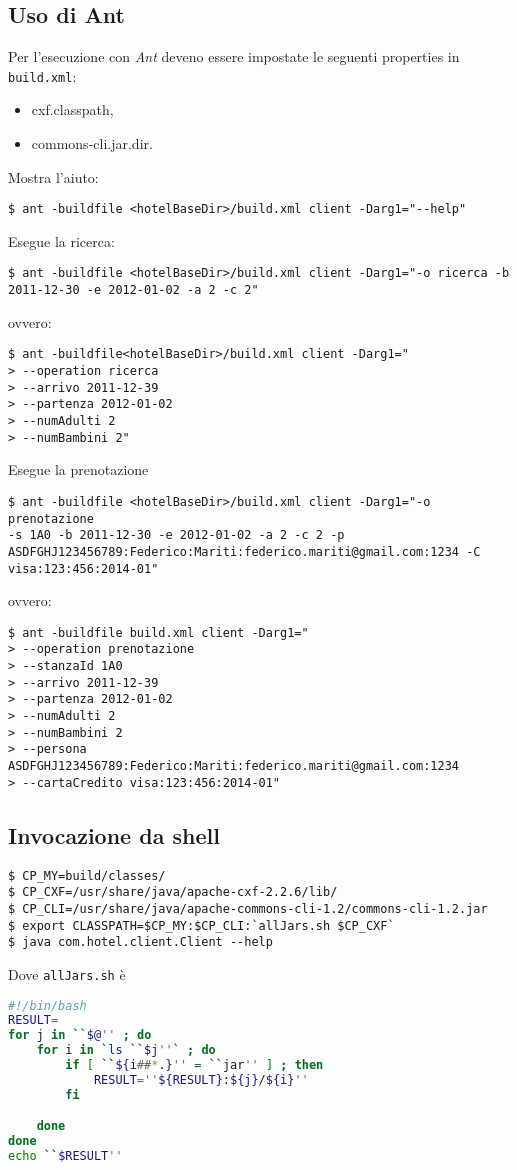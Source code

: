 \subsection{Uso di Ant}
Per l'esecuzione con \emph{Ant} deveno essere impostate le seguenti
properties in \verb'build.xml': 
\begin{itemize}
\item cxf.classpath, 
\item commons-cli.jar.dir.
\end{itemize}
Mostra l'aiuto:
\begin{verbatim}
$ ant -buildfile <hotelBaseDir>/build.xml client -Darg1="--help"
\end{verbatim}
Esegue la ricerca:
\begin{verbatim}
$ ant -buildfile <hotelBaseDir>/build.xml client -Darg1="-o ricerca -b
2011-12-30 -e 2012-01-02 -a 2 -c 2"
\end{verbatim}
ovvero:
\begin{verbatim}
$ ant -buildfile<hotelBaseDir>/build.xml client -Darg1="
> --operation ricerca 
> --arrivo 2011-12-39 
> --partenza 2012-01-02 
> --numAdulti 2 
> --numBambini 2"
\end{verbatim}
Esegue la prenotazione
\begin{verbatim}
$ ant -buildfile <hotelBaseDir>/build.xml client -Darg1="-o prenotazione
-s 1A0 -b 2011-12-30 -e 2012-01-02 -a 2 -c 2 -p
ASDFGHJ123456789:Federico:Mariti:federico.mariti@gmail.com:1234 -C
visa:123:456:2014-01"
\end{verbatim}
ovvero:
\begin{verbatim}
$ ant -buildfile build.xml client -Darg1="
> --operation prenotazione
> --stanzaId 1A0
> --arrivo 2011-12-39 
> --partenza 2012-01-02 
> --numAdulti 2 
> --numBambini 2
> --persona
ASDFGHJ123456789:Federico:Mariti:federico.mariti@gmail.com:1234
> --cartaCredito visa:123:456:2014-01"
\end{verbatim}

\subsection{Invocazione da shell}
\begin{verbatim}
$ CP_MY=build/classes/
$ CP_CXF=/usr/share/java/apache-cxf-2.2.6/lib/
$ CP_CLI=/usr/share/java/apache-commons-cli-1.2/commons-cli-1.2.jar 
$ export CLASSPATH=$CP_MY:$CP_CLI:`allJars.sh $CP_CXF`
$ java com.hotel.client.Client --help
\end{verbatim}
Dove \verb'allJars.sh' \`e
\begin{lstlisting}[language=bash]
#!/bin/bash
RESULT=
for j in ``$@'' ; do
    for i in `ls ``$j''` ; do
        if [ ``${i##*.}'' = ``jar'' ] ; then 
            RESULT=''${RESULT}:${j}/${i}''
        fi

    done
done
echo ``$RESULT''
\end{lstlisting}


